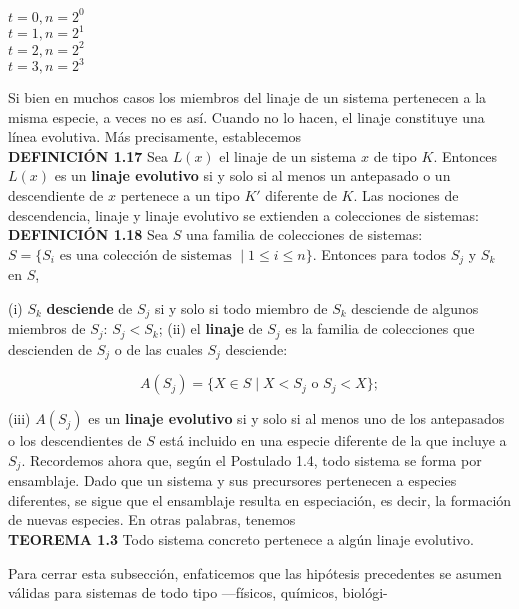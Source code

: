 {\fontsize{13}{15}\selectfont
\begin{flushright}
$t = 0, n = 2^0$ \\[1em]
$t = 1, n = 2^1$ \\[1em]
$t = 2, n = 2^2$ \\[1em]
$t = 3, n = 2^3$
\end{flushright}

Si bien en muchos casos los miembros del linaje de un sistema pertenecen a la misma especie, a veces no es así. Cuando no lo hacen, el linaje constituye una línea evolutiva. Más precisamente, establecemos \\

\textbf{DEFINICIÓN 1.17} Sea \( L(x) \) el linaje de un sistema \( x \) de tipo \( K \). Entonces \( L(x) \) es un \textbf{linaje evolutivo} si y solo si al menos un antepasado o un descendiente de \( x \) pertenece a un tipo \( K' \) diferente de \( K \).
Las nociones de descendencia, linaje y linaje evolutivo se extienden a colecciones de sistemas:\\

\textbf{DEFINICIÓN 1.18} Sea \( S \) una familia de colecciones de sistemas: \( S = \{S_i \text{ es una colección de sistemas } \mid 1 \leq i \leq n\} \). Entonces para todos \( S_j \) y \( S_k \) en \( S \),

(i) \( S_k \) \textbf{desciende} de \( S_j \) si y solo si todo miembro de \( S_k \) desciende de algunos miembros de \( S_j \): \( S_j < S_k \);
(ii) el \textbf{linaje} de \( S_j \) es la familia de colecciones que descienden de \( S_j \) o de las cuales \( S_j \) desciende:

\[A(S_j) = \{X \in S \mid X < S_j \text{ o } S_j < X\};\]

(iii) \( A(S_j) \) es un \textbf{linaje evolutivo} si y solo si al menos uno de los antepasados o los descendientes de \( S \) está incluido en una especie diferente de la que incluye a \( S_j \).
Recordemos ahora que, según el Postulado 1.4, todo sistema se forma por ensamblaje. Dado que un sistema y sus precursores pertenecen a especies diferentes, se sigue que el ensamblaje resulta en especiación, es decir, la formación de nuevas especies. 
En otras palabras, tenemos\\

\textbf{TEOREMA 1.3} Todo sistema concreto pertenece a algún linaje evolutivo.

Para cerrar esta subsección, enfaticemos que las hipótesis precedentes se asumen válidas para sistemas de todo tipo —físicos, químicos, biológi-
}

